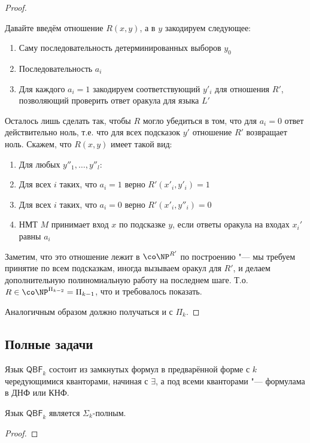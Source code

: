 \begin{proof}
\begin{description}
				Давайте введём отношение $R(x, y)$, а в $y$ закодируем следующее:
				\begin{enumerate}
					\item Саму последовательность детерминированных выборов $y_0$
					\item Последовательность $a_i$
					\item Для каждого $a_i=1$ закодируем соответствующий $y'_i$ для отношения $R'$, позволяющий проверить ответ оракула для языка $L'$
				\end{enumerate}
				Осталось лишь сделать так, чтобы $R$ могло убедиться в том, что для $a_i=0$ ответ действительно ноль, т.е. что для всех подсказок $y'$ отношение $R'$ возвращает ноль.
				Скажем, что $R(x, y)$ имеет такой вид:
				\begin{enumerate}
					\item Для любых $y''_1, \dots, y''_l$:
					\item Для всех $i$ таких, что $a_i=1$ верно $R'(x'_i, y'_i)=1$
					\item Для всех $i$ таких, что $a_i=0$ верно $R'(x'_i, y''_i)=0$
					\item НМТ $M$ принимает вход $x$ по подсказке $y$, если ответы оракула на входах $x_i'$ равны $a_i$
				\end{enumerate}
				Заметим, что это отношение лежит в $\co\NP^{R'}$ по построению "--- мы требуем принятие по всем подсказкам, иногда вызываем оракул для $R'$, и делаем дополнительную полиномиальную работу на последнем шаге.
				Т.о. $R \in \co\NP^{\Pi_{k-2}} = \Pi_{k-1}$, что и требовалось показать.
		\end{description}
		Аналогичным образом должно получаться и с $\Pi_k$.
		\TODO
	\end{proof}

\subsection{Полные задачи}
	\begin{Def}
		Язык $\mathsf{QBF}_k$ состоит из замкнутых формул в предварённой форме с $k$ чередующимися кванторами, начиная с $\exists$,
		а под всеми кванторами "--- формулама в ДНФ или КНФ.
	\end{Def}
	\begin{assertion}
		Язык $\mathsf{QBF}_k$ является $\Sigma_k$-полным.
	\end{assertion}
	\begin{proof}
		\TODO
	\end{proof}


